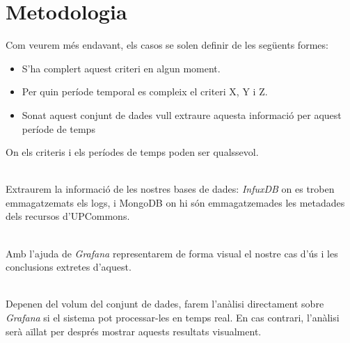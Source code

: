 \section{Metodologia}\label{sec:analysis-visualization-methodology}

\noindent
Com veurem més endavant, els casos se solen definir de les següents formes:

\begin{itemize}
    \item S'ha complert aquest criteri en algun moment.
    \item Per quin període temporal es compleix el criteri X, Y i Z.
    \item Sonat aquest conjunt de dades vull extraure aquesta informació per aquest període de temps
\end{itemize}

\noindent
On els criteris i els períodes de temps poden ser qualssevol.

\noindent \\
Extraurem la informació de les nostres bases de dades: \textit{InfuxDB} on es troben emmagatzemats els logs, i MongoDB on hi són emmagatzemades les metadades dels recursos d'\gls{UPCommons}.

\noindent \\
Amb l'ajuda de \textit{Grafana} representarem de forma visual el nostre cas d'ús i les conclusions extretes d'aquest.

\noindent \\
Depenen del volum del conjunt de dades,  farem l'anàlisi directament sobre \textit{Grafana} si el sistema pot processar-les en temps real.
En cas contrari, l'anàlisi serà aïllat per després mostrar aquests resultats visualment.
